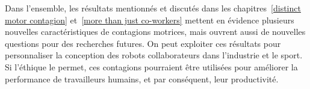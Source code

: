 
Dans l'ensemble, les résultats mentionnés et discutés dans les chapitres~\ref{distinct motor contagion} et~\ref{more than just co-workers} mettent en évidence plusieurs nouvelles caractéristiques de contagions motrices, mais ouvrent aussi de nouvelles questions pour des recherches futures. On peut exploiter ces résultats pour personnaliser la conception des robots collaborateurs dans l'industrie et le sport. Si l'éthique le permet, ces contagions pourraient être utilisées pour améliorer la performance de travailleurs humains, et par conséquent, leur productivité.




